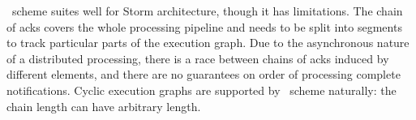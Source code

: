 \acker\ scheme suites well for Storm architecture, though it has limitations. The chain of acks covers the whole processing pipeline and needs to be split into segments to track particular parts of the execution graph. Due to the asynchronous nature of a distributed processing, there is a race between chains of acks induced by different elements, and there are no guarantees on order of processing complete notifications. Cyclic execution graphs are supported by \acker\ scheme naturally: the chain length can have arbitrary length.







